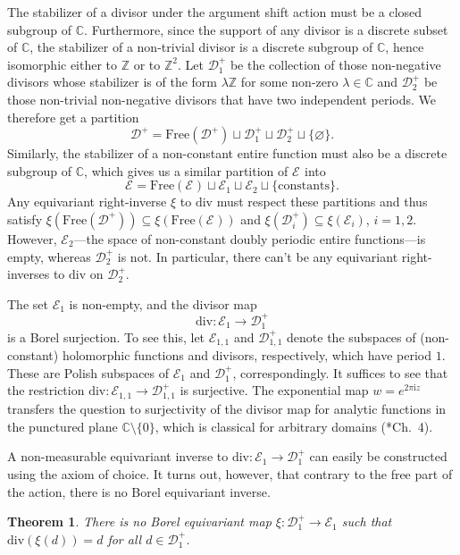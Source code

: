 \documentclass[12pt]{paper}
\numberwithin{equation}{section}
\theoremstyle{plain}
\newtheorem{theorem}{Theorem}[section]
\theoremstyle{definition}
\newcommand{\C}{\mathbb{C}}
\newcommand{\Z}{\mathbb{Z}}
\newcommand{\im}{\mathrm{i}} %
\newcommand{\holom}[1][]{\mathcal{E}_{#1}}
\newcommand{\divis}[1][]{\mathcal{D}_{#1}}
\newcommand{\divisp}[1][]{\divis[#1]^{+}}
\newcommand{\dm}{\mathrm{div}}      %
\newcommand{\free}{\mathrm{Free}}
\begin{document}
The stabilizer of a divisor under the argument shift action must be a closed subgroup of \(\C\).
Furthermore, since the support of any divisor is a discrete subset of \(\C\), the stabilizer of a
non-trivial divisor is a discrete subgroup of \(\C\), hence isomorphic either to \(\Z\) or to
\(\Z^{2}\).  Let \(\divisp[1]\) be the collection of those non-negative divisors whose stabilizer is
of the form \(\lambda \Z\) for some non-zero \(\lambda \in \C\) and \(\divisp[2]\) be those
non-trivial non-negative divisors that have two independent periods.  We therefore get a partition
\[\divisp = \free(\divisp) \sqcup \divisp[1] \sqcup \divisp[2] \sqcup \{\varnothing\}.\]
Similarly, the stabilizer of a non-constant entire function must also be a discrete subgroup of
\(\C\), which gives us a similar partition of \(\holom\) into
\[\holom = \free(\holom) \sqcup \holom[1] \sqcup \holom[2] \sqcup \{\textrm{constants}\}.\]
Any equivariant right-inverse \(\xi\) to \(\dm\) must respect these partitions and thus satisfy
\(\xi(\free(\divisp)) \subseteq \xi(\free(\holom)) \) and
\(\xi(\divisp[i]) \subseteq \xi(\holom[i])\), \(i = 1,2\).  However, \(\holom[2]\)---the space of
non-constant doubly periodic entire functions---is empty, whereas \(\divisp[2]\) is not.  In
particular, there can't be any equivariant right-inverses to \(\dm\) on \(\divisp[2]\).

The set \(\holom[1]\) is non-empty, and the divisor map
\[
  \dm:\holom[1]\to\divisp[1]
\]
is a Borel surjection. To see this, let \(\holom[1,1]\) and \(\divisp[1,1]\) denote the subspaces of
(non-constant) holomorphic functions and divisors, respectively, which have period \(1\). These are
Polish subspaces of \(\holom[1]\) and \(\divisp[1]\), correspondingly. It suffices to see that the
restriction \(\dm:\holom[1,1]\to\divisp[1,1]\) is surjective. The exponential map
\(w=e^{2\pi \im z}\) transfers the question to surjectivity of the divisor map for analytic
functions in the punctured plane \(\C\setminus\{0\}\), which is classical for arbitrary domains
(\cite{MR1483074}*{Ch.~4}).

A non-measurable equivariant inverse to \(\dm\colon \holom[1]\to\divisp[1]\) can easily be
constructed using the axiom of choice. It turns out, however, that contrary to the free part of the
action, there is no Borel equivariant inverse.

\begin{theorem}
  \label{thm:no-borel-equivariant-inverse-1-periodic}
  There is no Borel equivariant map \(\xi : \divisp[1] \to \holom[1]\) such that \(\dm(\xi(d)) = d\)
  for all \(d \in \divisp[1]\).
\end{theorem}
\end{document}
